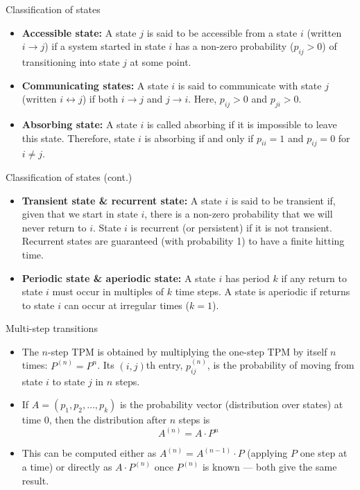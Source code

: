 \documentclass[aspectratio=169]{beamer}
\begin{document}
 
    \begin{frame}{Classification of states}
        \begin{itemize}
            \item \textbf{Accessible state:} A state $j$ is said to be accessible from a state $i$ (written $i \to j$) if a system started in state $i$ has a non-zero probability ($p_{ij} > 0$) of transitioning into state $j$ at some point.
            \item \textbf{Communicating states:} A state $i$ is said to communicate with state $j$ (written $i \leftrightarrow j$) if both $i \to j$ and $j \to i$. Here, $p_{ij} > 0$ and $p_{ji} > 0$.
            \item \textbf{Absorbing state:} A state $i$ is called absorbing if it is impossible to leave this state. Therefore, state $i$ is absorbing if and only if $p_{ii} = 1$ and $p_{ij} = 0$ for $i \neq j$.
        \end{itemize}
    \end{frame}
 
    \begin{frame}{Classification of states (cont.)}
        \begin{itemize}
            \item \textbf{Transient state \& recurrent state:} A state $i$ is said to be transient if, given that we start in state $i$, there is a non-zero probability that we will never return to $i$. State $i$ is recurrent (or persistent) if it is not transient. Recurrent states are guaranteed (with probability 1) to have a finite hitting time.
            \item \textbf{Periodic state \& aperiodic state:} A state $i$ has period $k$ if any return to state $i$ must occur in multiples of $k$ time steps. A state is aperiodic if returns to state $i$ can occur at irregular times ($k=1$).
        \end{itemize}
    \end{frame}
 
    \begin{frame}{Multi-step transitions}
        \begin{itemize}
            \item The $n$-step TPM is obtained by multiplying the one-step TPM by itself $n$ times: $P^{(n)} = P^n$. Its $(i,j)$th entry, $p_{ij}^{(n)}$, is the probability of moving from state $i$ to state $j$ in $n$ steps.
            \item If $A = (p_1, p_2, \ldots, p_k)$ is the probability vector (distribution over states) at time 0, then the distribution after $n$ steps is
            \[
            A^{(n)} = A \cdot P^n
            \]
            \item This can be computed either as $A^{(n)} = A^{(n-1)} \cdot P$ (applying $P$ one step at a time) or directly as $A \cdot P^{(n)}$ once $P^{(n)}$ is known — both give the same result.
        \end{itemize}
    \end{frame}
 
\end{document}
